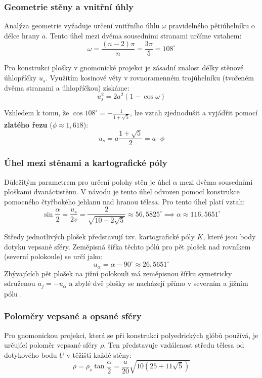 \documentclass[12pt, a4paper]{article}
\begin{document}
\subsubsection{Geometrie stěny a vnitřní úhly}

Analýza geometrie vyžaduje určení vnitřního úhlu $\omega$ pravidelného pětiúhelníku o délce hrany $a$. Tento úhel mezi dvěma sousedními stranami určíme vztahem:
\[ \omega = \frac{(n-2)\pi}{n} = \frac{3\pi}{5} = 108^\circ \]


Pro konstrukci plošky v gnomonické projekci je zásadní znalost délky stěnové úhlopříčky $u_s$. Využitím kosinové věty v rovnoramenném trojúhelníku (tvořeném dvěma stranami a úhlopříčkou) získáme:
\[ u_s^2 = 2a^2(1 - \cos \omega) \]

Vzhledem k tomu, že $\cos 108^\circ = -\frac{1}{1+\sqrt{5}}$, lze vztah zjednodušit a vyjádřit pomocí \textbf{zlatého řezu} ($\phi \approx 1,618$):
\[ u_s = a \frac{1+\sqrt{5}}{2} = a \cdot \phi \]


\subsubsection{Úhel mezi stěnami a kartografické póly}
Důležitým parametrem pro určení polohy stěn je úhel $\alpha$ mezi dvěma sousedními ploškami dvanáctistěnu. V návodu \cite{bayer} je tento úhel odvozen pomocí konstrukce pomocného čtyřbokého jehlanu nad hranou tělesa. Pro tento úhel platí vztah:
\[ \sin\frac{\alpha}{2} = \frac{u_s}{2v} = \frac{2}{\sqrt{10-2\sqrt{5}}} \approx 56,5825^\circ \implies \alpha \approx 116,5651^\circ \]

Středy jednotlivých plošek představují tzv. kartografické póly $K$, které jsou body dotyku vepsané sféry. Zeměpisná šířka těchto pólů pro pět plošek nad rovníkem (severní polokoule) se určí jako:
\[ u_{\alpha} = \alpha - 90^\circ \approx 26,5651^\circ \]
Zbývajících pět plošek na jižní polokouli má zeměpisnou šířku symetricky sdruženou $u_j = -u_{\alpha}$ a zbylé dvě plošky se nacházejí přímo v severním a jižním pólu \cite{bayer}.



\subsubsection{Poloměry vepsané a opsané sféry}
Pro gnomonickou projekci, která se při konstrukci polyedrických glóbů používá, je určující poloměr vepsané sféry $\rho$. Ten představuje vzdálenost středu tělesa od dotykového bodu $U$ v těžišti každé stěny:
\[ \rho = \rho_s \tan\frac{\alpha}{2} = \frac{a}{20}\sqrt{10(25+11\sqrt{5})} \]
\end{document}
